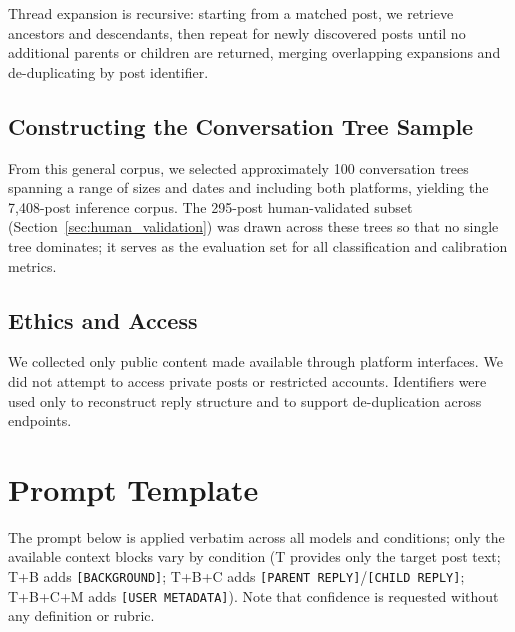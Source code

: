 \documentclass[11pt]{article}
\begin{document}
Thread expansion is recursive: starting from a matched post, we retrieve ancestors and
descendants, then repeat for newly discovered posts until no additional parents
or children are returned, merging overlapping expansions and de-duplicating by post identifier.

\subsection{Constructing the Conversation Tree Sample}
From this general corpus, we selected approximately 100 conversation trees spanning a range of
sizes and dates and including both platforms, yielding the 7{,}408-post inference corpus.
The 295-post human-validated subset (Section~\ref{sec:human_validation}) was drawn across these
trees so that no single tree dominates; it serves as the evaluation set for all
classification and calibration metrics.

\subsection{Ethics and Access}
We collected only public content made available through platform interfaces. We did not
attempt to access private posts or restricted accounts. Identifiers were used only to
reconstruct reply structure and to support de-duplication across endpoints.

\section{Prompt Template}
\label{app:prompt}

The prompt below is applied verbatim across all models and conditions; only the
available context blocks vary by condition (T provides only the target post text;
T+B adds \texttt{[BACKGROUND]}; T+B+C adds \texttt{[PARENT REPLY]}/\texttt{[CHILD REPLY]};
T+B+C+M adds \texttt{[USER METADATA]}). Note that confidence is requested without any
definition or rubric.
\end{document}
